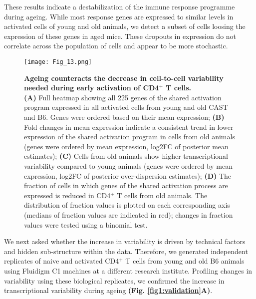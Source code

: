 These results indicate a destabilization of the immune response programme during ageing. While most response genes are expressed to similar levels in activated cells of young and old animals, we detect a subset of cells loosing the expression of these genes in aged mice. These dropouts in expression do not correlate across the population of cells and appear to be more stochastic.

\newpage

\begin{figure}[!ht]
\centering
\texttt{[image: Fig\_13.png]}
\caption[Ageing destabilizes the CD4$^+$ T cell response]{\textbf{Ageing counteracts the decrease in cell-to-cell variability needed during early activation of CD4$^+$ T cells.} \\
\textbf{(A)} Full heatmap showing all 225 genes of the shared activation program expressed in all activated cells from young and old CAST and B6. Genes were ordered based on their mean expression; \textbf{(B)} Fold changes in mean expression indicate a consistent trend in lower expression of the shared activation program in cells from old animals (genes were ordered by mean expression, log2FC of posterior mean estimates); \textbf{(C)} Cells from old animals show higher transcriptional variability compared to young animals (genes were ordered by mean expression, log2FC of posterior over-dispersion estimates); \textbf{(D)} The fraction of cells in which genes of the shared activation process are expressed is reduced in CD4$^+$ T cells from old animals. The distribution of fraction values is plotted on each corresponding axis (medians of fraction values are indicated in red); changes in fraction values were tested using a binomial test.}
\label{fig1:variability_ageing}
\end{figure}

We next asked whether the increase in variability is driven by technical factors and hidden sub-structure within the data. Therefore, we generated independent replicates of naive and activated CD4$^+$ T cells from young and old B6 animals using Fluidigm C1 machines at a different research institute. Profiling changes in variability using these biological replicates, we confirmed the increase in transcriptional variability during ageing \textbf{(Fig. \ref{fig1:validation}A)}.

